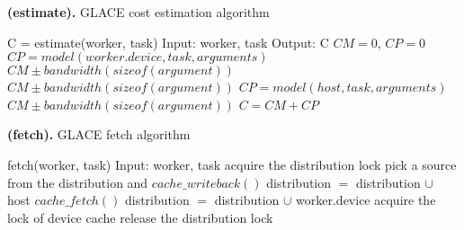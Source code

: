 \documentclass[preprint,11pt]{elsarticle}
\begin{document}
\begin{algorithm}
\caption{{\bf (estimate).} GLACE cost estimation algorithm}
\label{alg:estimate}
{\footnotesize
\begin{algorithmic} [1]
\STATE C = estimate(worker, task)
\STATE Input: worker, task
\STATE Output: C
\STATE $CM = 0$, $CP = 0$
  \STATE $CP = model(worker.device, task, arguments)$
      \STATE $CM \pm bandwidth(sizeof(argument))$
        \STATE $CM \pm bandwidth(sizeof(argument))$
      \ENDIF
    \ENDIF
  \ENDFOR 
\ELSE
  \STATE $CP = model(host, task, arguments)$
      \STATE $CM \pm bandwidth(sizeof(argument))$
    \ENDIF
  \ENDFOR 
\ENDIF
\STATE $C = CM + CP$
\end{algorithmic}
}
\end{algorithm}

\begin{algorithm}
\caption{{\bf (fetch).} GLACE fetch algorithm}
\label{alg:fetch}
{\footnotesize
\begin{algorithmic} [1]
\STATE fetch(worker, task)
\STATE Input: worker, task
  \STATE acquire the distribution lock   
      \STATE pick a source from the distribution and $cache\_writeback()$
      \STATE distribution $=$ distribution $\cup$ host
    \ENDIF
      \STATE $cache\_fetch()$
      \STATE distribution $=$ distribution $\cup$ worker.device
    \ENDIF
  \ENDIF
  \STATE acquire the lock of device cache
  \STATE release the distribution lock
\ENDFOR
\end{algorithmic}
}
\end{algorithm}
\end{document}
